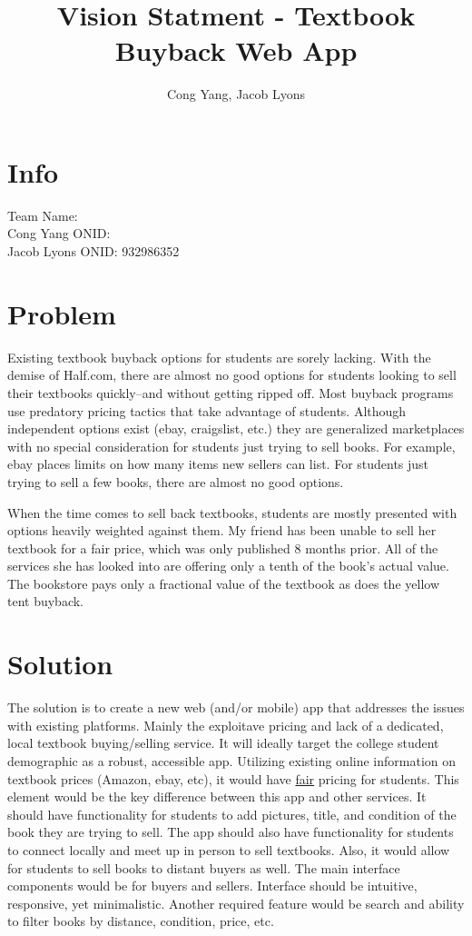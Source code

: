 \documentclass[12pt]{article}
\title{Vision Statment - Textbook Buyback Web App}
\author{Cong Yang, Jacob Lyons}
\begin{document}
	\maketitle

	\tableofcontents
                \section{Info}
		Team Name:      \\
		Cong Yang ONID: \\
		Jacob Lyons ONID: 932986352 \\


	\section{Problem}
	Existing textbook buyback options for students are sorely lacking. With the demise of Half.com, 
	there are almost no good options for students looking to sell their textbooks quickly--and without 
	getting ripped off.	
        Most buyback programs use predatory pricing tactics that take advantage of students. Although independent options 
	exist (ebay, craigslist, etc.) they are
	generalized marketplaces with no special consideration for students just trying to sell books. For example,
	ebay places limits on how many items new sellers can list. For students just trying to sell a few books,
	there are almost no good options.
	
	When the time comes to sell back textbooks, students are mostly presented with options heavily weighted
	against them. My friend has been unable to sell her textbook for a fair price, which was only published 8 months prior.
	All of the services she has looked into are offering only a tenth of the book's actual value. The bookstore pays only
	a fractional value of the textbook as does the yellow tent buyback.
		

	\section{Solution}

	The solution is to create a new web (and/or mobile) app that addresses the issues with existing platforms. Mainly the
	exploitave pricing and lack of a dedicated, local textbook buying/selling service.
	It will ideally target the college student demographic as a robust, accessible app. Utilizing existing online
        information on textbook prices (Amazon, ebay, etc), it would have \underline{fair} pricing for students. This element would be the
	key difference between this app and other services.
	It should have functionality for students to add pictures, title, and condition of the book they are trying to sell.
	The app should also have functionality for students to connect locally and meet up in person to sell textbooks.
        Also, it would allow for students to sell books to distant buyers as well.
	The main interface components would be for buyers and sellers. Interface should be intuitive, responsive,
        yet minimalistic. Another required feature would be search and ability to filter books by distance, condition, price, etc.
\end{document}
